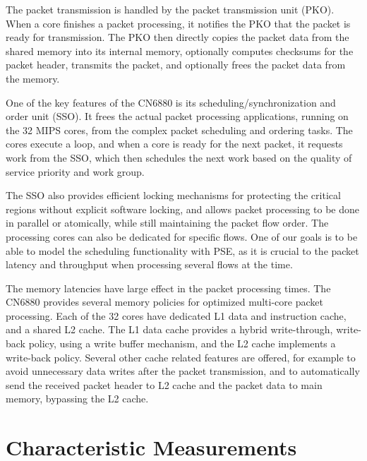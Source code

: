 The packet transmission is handled by the packet transmission unit (PKO). When a core finishes a packet processing, it notifies the PKO that the packet is ready for transmission. The PKO then directly copies the packet data from the shared memory into its internal memory, optionally computes checksums for the packet header, transmits the packet, and optionally frees the packet data from the memory.~\cite{cavium:2010:fundamentals}

One of the key features of the CN6880 is its scheduling/synchronization and order unit (SSO). It frees the actual packet processing applications, running on the 32 MIPS cores, from the complex packet scheduling and ordering tasks. The cores execute a loop, and when a core is ready for the next packet, it requests work from the SSO, which then schedules the next work based on the quality of service priority and work group.~\cite{cavium:2010:fundamentals}

The SSO also provides efficient locking mechanisms for protecting the critical regions without explicit software locking, and allows packet processing to be done in parallel or atomically, while still maintaining the packet flow order. The processing cores can also be dedicated for specific flows. One of our goals is to be able to model the scheduling functionality with PSE, as it is crucial to the packet latency and throughput when processing several flows at the time.~\cite{cavium:2010:fundamentals}

The memory latencies have large effect in the packet processing times. The CN6880 provides several memory policies for optimized multi-core packet processing. Each of the 32 cores have dedicated L1 data and instruction cache, and a shared L2 cache. The L1 data cache provides a hybrid write-through, write-back policy, using a write buffer mechanism, and the L2 cache implements a write-back policy. Several other cache related features are offered, for example to avoid unnecessary data writes after the packet transmission, and to automatically send the received packet header to L2 cache and the packet data to main memory, bypassing the L2 cache.~\cite{cavium:2010:fundamentals}


\section{Characteristic Measurements}
\label{sec:characteristic-measurements}

